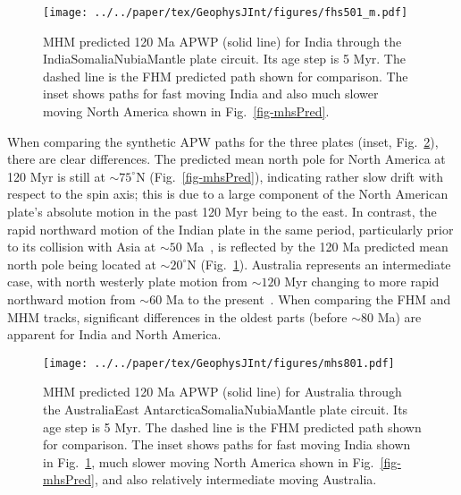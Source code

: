 \begin{figure}[!ht]
  \centering
  \texttt{[image: ../../paper/tex/GeophysJInt/figures/fhs501\_m.pdf]}
  \caption[120 Ma MHM vs FHM predicted APWP of India]{MHM predicted
    120 Ma APWP (solid line) for India through the
    India\textendash{}Somalia\textendash{}Nubia\textendash{}Mantle plate circuit.
    Its age step is 5 Myr. The dashed line is the FHM predicted path shown for
    comparison. The inset shows paths for fast moving India and also much slower
    moving North America shown in Fig.~\ref{fig-mhsPred}.}\label{fig-mhsPred501}
\end{figure}

When comparing the synthetic APW paths for the three plates (inset,
Fig.~\ref{fig-mhsPred801}), there are clear differences. The predicted mean
north pole for North America at 120 Myr is still at ${\sim}75^{\circ}$N
(Fig.~\ref{fig-mhsPred}), indicating rather slow drift with respect to the spin
axis; this is due to a large component of the North American plate's absolute
motion in the past 120 Myr being to the east. In contrast, the rapid northward
motion of the Indian plate in the same period, particularly prior to its
collision with Asia at ${\sim}50$ Ma~\citep{N10}, is reflected by
the 120 Ma predicted mean north pole being located at ${\sim}20^{\circ}$N
(Fig.~\ref{fig-mhsPred501}). Australia represents an intermediate case, with
north westerly plate motion from ${\sim}120$ Myr changing to more
rapid northward motion from ${\sim}60$ Ma to the present~\citep{W07}.
When comparing the FHM and MHM tracks, significant differences in the oldest
parts (before ${\sim}80$ Ma) are apparent for India and North America.

\begin{figure}[!ht]
  \centering
  \texttt{[image: ../../paper/tex/GeophysJInt/figures/mhs801.pdf]}
  \caption[120 Ma MHM vs FHM predicted APWP of Australia]{MHM
    predicted 120 Ma APWP (solid line) for Australia through the
    Australia\textendash{}East
    Antarctica\textendash{}Somalia\textendash{}Nubia\textendash{}Mantle plate
    circuit. Its age step is 5 Myr. The dashed line is the FHM predicted path
    shown for comparison. The inset shows paths for fast moving India shown in
    Fig.~\ref{fig-mhsPred501}, much slower moving North America shown in
    Fig.~\ref{fig-mhsPred}, and also relatively intermediate moving
    Australia.}\label{fig-mhsPred801}
\end{figure}

